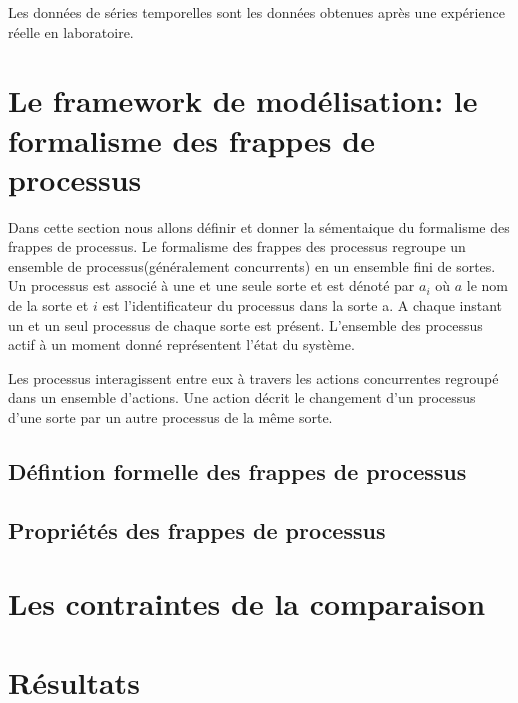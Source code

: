 \documentclass[11pt,a4paper,twoside]{epig}
\begin{document}
Les données de séries temporelles sont les données obtenues après une expérience réelle en laboratoire. 

\section{Le framework de modélisation: le formalisme des frappes de processus}

Dans cette section nous allons définir et donner la sémentaique du formalisme des frappes de processus. Le formalisme des frappes des processus 
regroupe un ensemble de processus(généralement concurrents) en un ensemble fini de sortes. Un processus est associé à une et une seule sorte et 
est dénoté par $a_{i}$ où $a$ le nom de la sorte et $i$ est l'identificateur du processus dans la sorte a. A chaque instant un et un seul processus 
de chaque sorte est présent. L'ensemble des processus actif à un moment donné représentent l'état du système.

Les processus interagissent entre eux à travers les actions concurrentes regroupé dans un ensemble d'actions. Une action décrit le changement d'un 
processus d'une sorte par un autre processus de la même sorte.	

\subsection{Défintion formelle des frappes de processus}

\subsection{Propriétés des frappes de processus}


\section{Les contraintes de la comparaison}




\section{Résultats}
\end{document}
